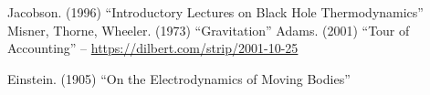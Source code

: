 \documentclass[12pt]{article}
\begin{document}







\begin{thebibliography}{9}
 Jacobson. (1996) ``Introductory Lectures on Black Hole Thermodynamics''
 Misner, Thorne, Wheeler. (1973) ``Gravitation''
 Adams. (2001) ``Tour of Accounting'' -- \url{https://dilbert.com/strip/2001-10-25}

 Einstein. (1905) ``On the Electrodynamics of Moving Bodies''

\end{thebibliography}
\end{document}
